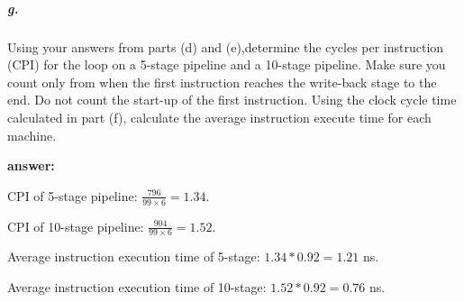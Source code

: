 \documentclass{article}
\begin{document}
\subparagraph{g.} Using your answers from parts (d) and (e),determine the cycles per instruction (CPI) for the loop on a 5-stage pipeline and a 10-stage pipeline. Make sure you count only from when the first instruction reaches the write-back stage to the end. Do not count the start-up of the first instruction. Using the clock cycle time calculated in part (f), calculate the average instruction execute time for each machine.

\noindent \textbf{answer:}

CPI of 5-stage pipeline: $\frac{796}{99\times 6}=1.34$.

CPI of 10-stage pipeline: $\frac{904}{99\times 6}=1.52$.

Average instruction execution time of 5-stage: $1.34*0.92=1.21$ ns.

Average instruction execution time of 10-stage: $1.52*0.92=0.76$ ns.
\end{document}
